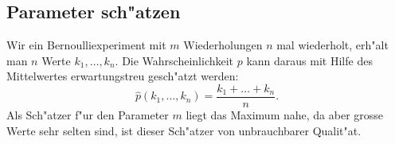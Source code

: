 \subsection{Parameter sch"atzen}
Wir ein Bernoulliexperiment mit $m$ Wiederholungen $n$ mal wiederholt, erh"alt
man $n$ Werte $k_1,\dots,k_n$.
Die Wahrscheinlichkeit $p$ kann daraus mit Hilfe des Mittelwertes erwartungstreu
gesch"atzt werden:
\[
\hat p(k_1,\dots, k_n)=\frac{k_1+\dots+k_n}{n}.
\]
Als Sch"atzer f"ur den Parameter $m$ liegt das Maximum nahe, da aber
grosse Werte sehr selten sind, ist dieser Sch"atzer von unbrauchbarer
Qualit"at.

